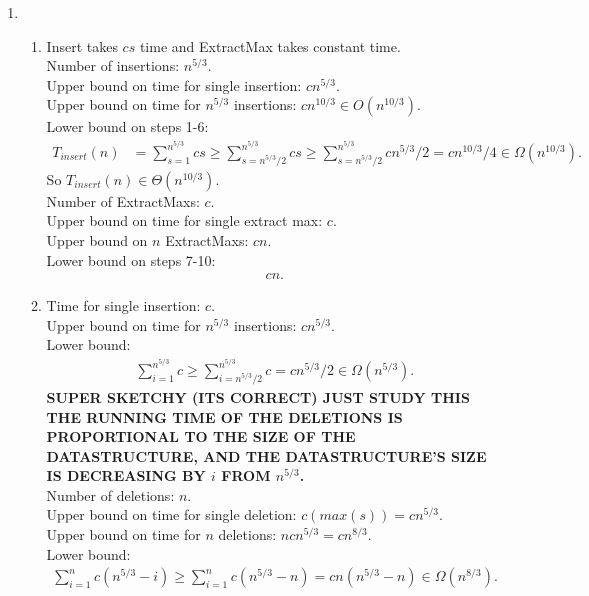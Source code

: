 \documentclass[10pt,oneside,reqno]{amsart}
\theoremstyle{plain}
\theoremstyle{definition}
\begin{document}
\begin{enumerate}[label=\arabic*.]
\item 
\begin{enumerate}
\item Insert takes $cs$ time and ExtractMax takes constant time. \\
Number of insertions: $n^{5/3}$. \\
Upper bound on time for single insertion: $cn^{5/3}$. \\
Upper bound on time for $n^{5/3}$ insertions: $cn^{10/3} \in O(n^{10/3})$. \\
Lower bound on steps 1-6: 
\begin{equation}
\begin{aligned}
T_{insert}(n) &= \sum_{s = 1}^{n^{5/3}}cs \geq  \sum_{s = n^{5/3}/2}^{n^{5/3}}cs\geq \sum_{s = n^{5/3}/2}^{n^{5/3}}cn^{5/3}/2 = cn^{10/3}/4 \in \Omega(n^{10/3}). 
\end{aligned}
\end{equation}
So $T_{insert}(n) \in \Theta(n^{10/3})$. \\
Number of ExtractMaxs: $c$.\\
Upper bound on time for single extract max: $c$. \\
Upper bound on $n$ ExtractMaxs: $cn$. \\
Lower bound on steps 7-10: 
\begin{equation}
\begin{aligned}
cn. 
\end{aligned}
\end{equation}


\item Time for single insertion: $c$. \\
Upper bound on time for $n^{5/3}$ insertions: $cn^{5/3}$. \\
Lower bound: 
\begin{equation}
\begin{aligned}
\sum_{i = 1}^{n^{5/3}} c \geq \sum_{i = n^{5/3}/2}^{n^{5/3}} c = cn^{5/3}/2 \in \Omega(n^{5/3}). 
\end{aligned}
\end{equation}
\textbf{SUPER SKETCHY (ITS CORRECT) JUST STUDY THIS THE RUNNING TIME OF THE DELETIONS IS PROPORTIONAL TO THE SIZE OF THE DATASTRUCTURE, AND THE DATASTRUCTURE'S SIZE IS DECREASING BY $i$ FROM $n^{5/3}$.}\\
Number of deletions: $n$. \\
Upper bound on time for single deletion: $c(max(s)) = cn^{5/3}$. \\
Upper bound on time for $n$ deletions: $ncn^{5/3} = cn^{8/3}$. \\
Lower bound: 
\begin{equation}
\begin{aligned}
\sum_{i = 1}^{n}c(n^{5/3} - i) \geq \sum_{i = 1}^{n}c(n^{5/3} - n) = cn(n^{5/3} - n) \in \Omega(n^{8/3}). 
\end{aligned}
\end{equation}
\end{enumerate}


\end{enumerate}
\end{document}
